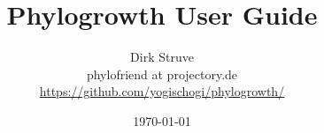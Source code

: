 \begin{titlepage}

\title{Phylogrowth User Guide}

\author{Dirk Struve\\
phylofriend at projectory.de\\
\href{https://github.com/yogischogi/phylogrowth/}{https://github.com/yogischogi/phylogrowth/}}
\date{\today}
\end{titlepage}
\maketitle
